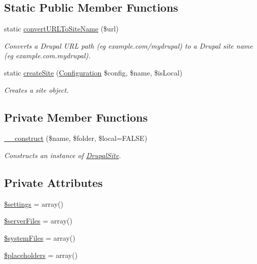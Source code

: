 \subsection*{Static Public Member Functions}
\begin{DoxyCompactItemize}
\item 
static \hyperlink{classDrupalSite_adfbb4d4c499f64777cfbf14b64a0b410}{convert\-U\-R\-L\-To\-Site\-Name} (\$url)
\begin{DoxyCompactList}\small\item\em Converts a Drupal U\-R\-L path (eg example.\-com/mydrupal) to a Drupal site name (eg example.\-com.\-mydrupal). \end{DoxyCompactList}\item 
static \hyperlink{classDrupalSite_a446d5a50b10b165e0518606862954acc}{create\-Site} (\hyperlink{classConfiguration}{Configuration} \$config, \$name, \$is\-Local)
\begin{DoxyCompactList}\small\item\em Creates a site object. \end{DoxyCompactList}\end{DoxyCompactItemize}
\subsection*{Private Member Functions}
\begin{DoxyCompactItemize}
\item 
\hyperlink{classDrupalSite_a459fc56d0bbc5787b066548e6dd3f18b}{\-\_\-\-\_\-construct} (\$name, \$folder, \$local=F\-A\-L\-S\-E)
\begin{DoxyCompactList}\small\item\em Constructs an instance of \hyperlink{classDrupalSite}{Drupal\-Site}. \end{DoxyCompactList}\end{DoxyCompactItemize}
\subsection*{Private Attributes}
\begin{DoxyCompactItemize}
\item 
\hyperlink{classDrupalSite_aa68deb563e47389d18801a7b65aba1b4}{\$settings} = array()
\item 
\hyperlink{classDrupalSite_a7640e2992d474dafa15b5764456816b8}{\$server\-Files} = array()
\item 
\hyperlink{classDrupalSite_a0ad106122ccf08f1b9ba547159018ba2}{\$system\-Files} = array()
\item 
\hyperlink{classDrupalSite_a37624cd207b1d019f87c02d22ed245e0}{\$placeholders} = array()
\end{DoxyCompactItemize}


